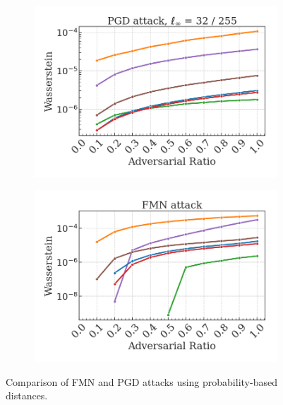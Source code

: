 \begin{figure}[H]
    \begin{subfigure}[b]{0.45\textwidth}
        \centering
        \includegraphics[width=\textwidth]{img/results_discussion/adversarial/PGD_W.png}
    \end{subfigure}
    \hfill
    \begin{subfigure}[b]{0.45\textwidth}
        \centering
        \includegraphics[width=\textwidth]{img/results_discussion/adversarial/FMN_W.png}
    \end{subfigure}

    \caption{Comparison of FMN and PGD attacks using probability-based distances.}
    \label{fig:comparison_prob_metrics}
\end{figure}

